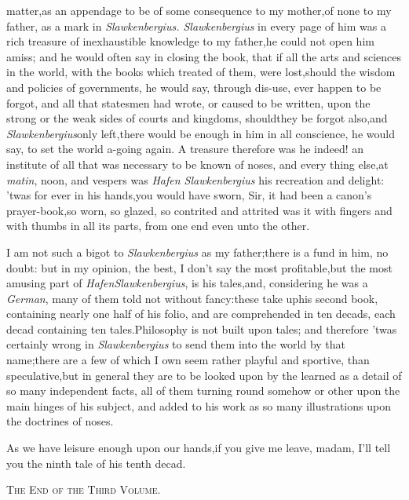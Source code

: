 \documentclass{article}
\begin{document}
 matter,\tsh as an appendage to\break
{}\break
be of some consequence to my
mother,\tsk of none to my father, as a mark in \textit{Slaw\-kenbergius.
Slawkenbergius} in every page of him was a rich treasure of
inexhaustible knowledge to my father,\tsk he could
not open \enlargethispage\baselineskip
him amiss; and he would often say in closing the book,
that if all the arts and sciences in the world, with the
books which treated of them, were lost,\tsk\break should the
wisdom and policies of governments, he would say, through
dis-\break use, ever happen to be forgot, and all that statesmen had
wrote, or caused to be written, upon the strong or the weak
sides of courts and kingdoms, should\break they be forgot
also,\tsk and \textit{Slawkenbergius}\break only left,\tsk there
would be enough in him in all conscience, he would say, to
set the world a-going again. A treasure therefore was he
indeed! an institute of all that was necessary to be known
of noses, and every thing else,\tsk at \textit{matin}, noon,
and vespers was \textit{Hafen Slawkenbergius} his recreation
and delight: ’twas for ever in his hands,\tsh you would have
sworn, Sir, it had been a canon’s prayer-book,\tsk so worn,
so glazed, so contrited and attrited was it with fingers
and with thumbs in all its parts, from one end even unto the
other.

I am not such a bigot to \textit{Slawkenber\-gius} as my
father;\tsk there is a fund in him, no doubt: but in my
opinion, the best, I don’t say the most profitable,\break but
the most amusing part of \textit{Hafen}\break\textit{Slawkenbergius}, is
his tales,\tsh and, considering he was a \textit{German},
many of them told not without fancy:\tsh these take up\break his
second book, containing nearly one half of his folio, and are
comprehended in ten decads, each decad containing ten
tales.\tsh Philosophy is not built upon tales; and
therefore ’twas certainly wrong in \textit{Slawkenbergius} to
send them into the world by that name;\tsk there are a few
of 
which I own seem
rather playful and spor\-tive, than speculative,\tsk but in
general
they are to be looked upon by the learned as a detail of so many
independent facts, all of them turning round somehow or other upon
the main hinges of his subject, and added to his work as so many
illustrations upon the doctrines of noses.

As we have leisure enough upon our hands,\tsh if you
give me leave, madam, I’ll tell you the ninth tale of his
tenth decad.

\bigskip
\centerline{\textsc{The End of the Third Volume}.}
\end{document}
